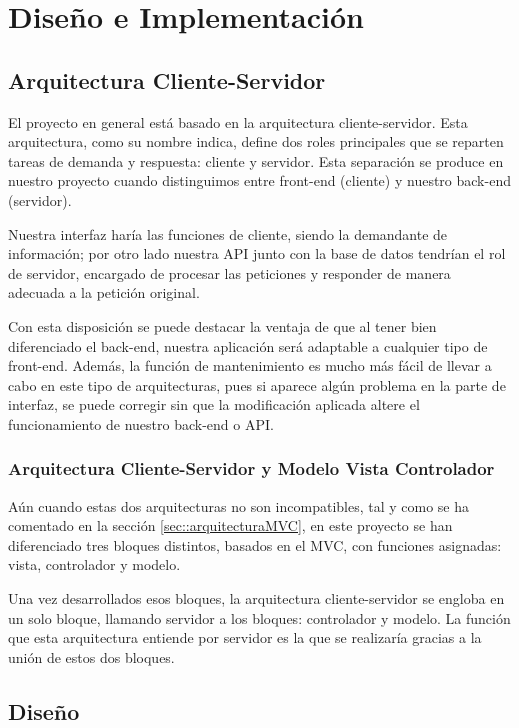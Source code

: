 \chapter{Diseño e Implementación}

\section{Arquitectura Cliente-Servidor}

El proyecto en general está basado en la arquitectura cliente-servidor\cite{clienteservidor}. Esta arquitectura, como su nombre indica, define dos roles principales que se reparten tareas de demanda y respuesta: cliente y servidor. Esta separación se produce en nuestro proyecto cuando distinguimos entre front-end (cliente) y nuestro back-end (servidor).

Nuestra interfaz haría las funciones de cliente, siendo la demandante de información; por otro lado nuestra API junto con la base de datos tendrían el rol de servidor, encargado de procesar las peticiones y responder de manera adecuada a la petición original.

Con esta disposición se puede destacar la ventaja de que al tener bien diferenciado el back-end, nuestra aplicación será adaptable a cualquier tipo de front-end. Además, la función de mantenimiento es mucho más fácil de llevar a cabo en este tipo de arquitecturas, pues si aparece algún problema en la parte de interfaz, se puede corregir sin que la modificación aplicada altere el funcionamiento de nuestro back-end o API.

\subsection{Arquitectura Cliente-Servidor y Modelo Vista Controlador}

Aún cuando estas dos arquitecturas no son incompatibles, tal y como se ha comentado en la sección \ref{sec::arquitecturaMVC}, en este proyecto se han diferenciado tres bloques distintos, basados en el MVC, con funciones asignadas: vista, controlador y modelo. 

Una vez desarrollados esos bloques, la arquitectura cliente-servidor se engloba en un solo bloque, llamando servidor a los bloques: controlador y modelo. La función que esta arquitectura entiende por servidor es la que se realizaría gracias a la unión de estos dos bloques.

\section{Diseño}

